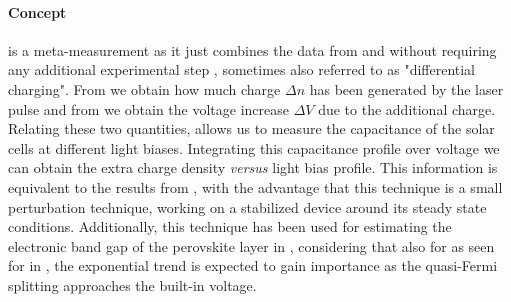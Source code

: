 	\paragraph{Concept}
	 is a meta-measurement as it just combines the data from  and  without requiring any additional experimental step \cite{ORegan2005,ORegan2006,Shuttle2008,Credgington2014,Maurano2011}, sometimes also referred to as "differential charging".
	From  we obtain how much charge $\Delta n$ has been generated by the laser pulse and from  we obtain the voltage increase $\Delta V$ due to the additional charge.
	Relating these two quantities,  allows us to measure the capacitance of the solar cells at different light biases.
	Integrating this capacitance profile over voltage we can obtain the extra charge density \textsl{versus} light bias profile.
	This information is equivalent to the results from , with the advantage that this technique is a small perturbation technique, working on a stabilized device around its steady state conditions.
	Additionally, this technique has been used for estimating the electronic band gap of the perovskite layer in , considering that also for  as seen for  in , the exponential trend is expected to gain importance as the quasi-Fermi splitting approaches the built-in voltage.
	

